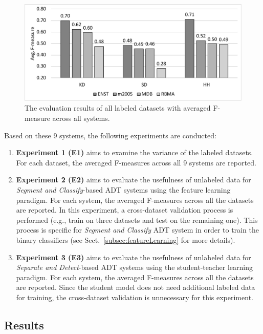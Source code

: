 \documentclass{article}
\begin{document}
\begin{figure}
\centering
\includegraphics[width = \columnwidth]{./figs/avgAcrossDatasets.pdf}
\caption{The evaluation results of all labeled datasets with averaged F-measure across all systems.}
\label{fig:resultsAcrossDatasets}
\end{figure}

Based on these 9 systems, the following experiments are conducted:
\begin{enumerate}[]
\item \textbf{Experiment 1 (E1)} aims to examine the variance of the labeled datasets. For each dataset, the averaged F-measures across all 9 systems are reported. 
\item \textbf{Experiment 2 (E2)} aims to evaluate the usefulness of unlabeled data for \textit{Segment and Classify}-based ADT systems using the feature learning paradigm. For each system, the averaged F-measures across all the datasets are reported. In this experiment, a cross-dataset validation process is performed (e.g., train on three datasets and test on the remaining one). This process is specific for \textit{Segment and Classify} ADT system in order to train the binary classifiers (see Sect.~\ref{subsec:featureLearning} for more details).
\item \textbf{Experiment 3 (E3)} aims to evaluate the usefulness of unlabeled data for \textit{Separate and Detect}-based ADT systems using the student-teacher learning paradigm. For each system, the averaged F-measures across all the datasets are reported. Since the student model does not need additional labeled data for training, the cross-dataset validation is unnecessary for this experiment. 
\end{enumerate}

\subsection{Results}
\end{document}
